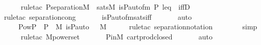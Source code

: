 \begin{isabellebody}
\ \ \ \ \isamarkupfalse%
{\isacharparenleft}{\kern0pt}rule{\isacharunderscore}{\kern0pt}tac\ P{\isacharequal}{\kern0pt}{\isachardoublequoteopen}separation{\isacharparenleft}{\kern0pt}{\isacharhash}{\kern0pt}{\isacharhash}{\kern0pt}M{\isacharcomma}{\kern0pt}\ {\isasymlambda}{\isasympi}{\isachardot}{\kern0pt}\ sats{\isacharparenleft}{\kern0pt}M{\isacharcomma}{\kern0pt}\ is{\isacharunderscore}{\kern0pt}P{\isacharunderscore}{\kern0pt}auto{\isacharunderscore}{\kern0pt}fm{\isacharcomma}{\kern0pt}\ {\isacharbrackleft}{\kern0pt}{\isasympi}{\isacharbrackright}{\kern0pt}{\isacharat}{\kern0pt}{\isacharbrackleft}{\kern0pt}P{\isacharcomma}{\kern0pt}\ leq{\isacharbrackright}{\kern0pt}{\isacharparenright}{\kern0pt}{\isacharparenright}{\kern0pt}{\isachardoublequoteclose}\ \ iffD{}{\isacharparenright}{\kern0pt}\isanewline
\ \ \ \ \ \isamarkupfalse%
{\isacharparenleft}{\kern0pt}rule{\isacharunderscore}{\kern0pt}tac\ separation{\isacharunderscore}{\kern0pt}cong{\isacharparenright}{\kern0pt}\ \isanewline
\ \ \ \ \isamarkupfalse%
\ is{\isacharunderscore}{\kern0pt}P{\isacharunderscore}{\kern0pt}auto{\isacharunderscore}{\kern0pt}fm{\isacharunderscore}{\kern0pt}sats{\isacharunderscore}{\kern0pt}iff\ \isanewline
\ \ \ \ \isamarkupfalse%
\ auto\isanewline
\ \ \isamarkupfalse%
\ \isamarkupfalse%
\ {\isachardoublequoteopen}{\isacharbraceleft}{\kern0pt}\ {\isasympi}\ {\isasymin}\ Pow{\isacharparenleft}{\kern0pt}P\ {\isasymtimes}\ P{\isacharparenright}{\kern0pt}\ {\isasyminter}\ M{\isachardot}{\kern0pt}\ is{\isacharunderscore}{\kern0pt}P{\isacharunderscore}{\kern0pt}auto{\isacharparenleft}{\kern0pt}{\isasympi}{\isacharparenright}{\kern0pt}\ {\isacharbraceright}{\kern0pt}\ {\isasymin}\ M{\isachardoublequoteclose}\ \isanewline
\ \ \ \ \isamarkupfalse%
{\isacharparenleft}{\kern0pt}rule{\isacharunderscore}{\kern0pt}tac\ separation{\isacharunderscore}{\kern0pt}notation{\isacharparenright}{\kern0pt}\ \isanewline
\ \ \ \ \ \isamarkupfalse%
\ simp\ \isanewline
\ \ \ \ \isamarkupfalse%
{\isacharparenleft}{\kern0pt}rule{\isacharunderscore}{\kern0pt}tac\ M{\isacharunderscore}{\kern0pt}powerset{\isacharparenright}{\kern0pt}\ \isanewline
\ \ \ \ \isamarkupfalse%
\ P{\isacharunderscore}{\kern0pt}in{\isacharunderscore}{\kern0pt}M\ cartprod{\isacharunderscore}{\kern0pt}closed\ \isanewline
\ \ \ \ \isamarkupfalse%
\ auto\ \isanewline
\ \ \isamarkupfalse%
\ \isamarkupfalse%

\end{isabellebody}
